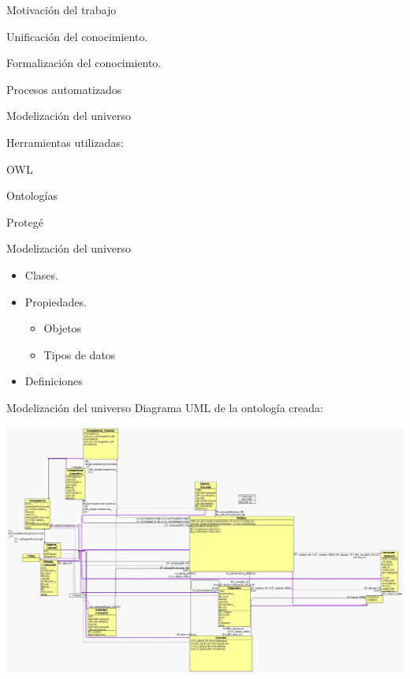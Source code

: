 \documentclass{beamer}
\begin{document}
\begin{frame}{Motivación del trabajo}
	\begin{LARGE}
		Unificación del conocimiento.
	
		Formalización del conocimiento.
	
		Procesos automatizados
	
	\end{LARGE}
\end{frame}

\begin{frame}{Modelización del universo}
\begin{LARGE}
	Herramientas utilizadas:
	
	OWL
	\pause	
	
	Ontologías
	\pause
	
	Protegé
	
\end{LARGE}
\end{frame}

\begin{frame}{Modelización del universo}
\begin{LARGE}

	\begin{itemize}
		\item Clases.
		\item Propiedades.
		\begin{itemize}
			\item Objetos
			\item Tipos de datos
		\end{itemize}
		\item Definiciones
	\end{itemize}		
	
\end{LARGE}
\end{frame}

\begin{frame}{Modelización del universo}
	Diagrama UML de la ontología creada:
	\begin{center}
		\includegraphics[width=1\textwidth]{Herramientas-OWLGrEd.png}
	\end{center}
\end{frame}
\end{document}
